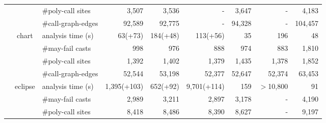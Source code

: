 \begin{table}[]
\begin{tabular}{@{}r|clrrrrrr@{}}
                                   &                           & \#poly-call sites    & 3,507                    & 3,536                      & -                           & 3,647                         & -                         & 4,183                      \\
                                   &                           & \#call-graph-edges   & 92,589                   & 92,775                     & -                           & 94,328                         & -                         & 104,457                     \\\cmidrule(){2-9}

                                   & \multirow{4}{*}{chart}    & analysis time (s)    & 63(+73)                       & 184(+48)                        & 113(+56)                        & 35                         & 196                      & 48                       \\
                                   &                           & \#may-fail casts     & 998                      & 976                        & 888                        & 974                         & 883                      & 1,810                         \\
                                   &                           & \#poly-call sites    & 1,392                    & 1,402                      & 1,379                      & 1,435                         & 1,378                         & 1,852                      \\
                                   &                           & \#call-graph-edges   & 52,544                   & 53,198                     & 52,377                     & 52,647                         & 52,374                         & 63,453                     \\\cmidrule(){2-9}
                                   & \multirow{4}{*}{eclipse}  & analysis time (s)    & 1,395(+103)                    & 652(+92)                        & 9,701(+114)                           & 159                         & $>$10,800     & 91                         \\
                                   &                           & \#may-fail casts     & 2,989                    & 3,211                      & 2,897                           & 3,178                         & -                         & 4,190                      \\
                                   &                           & \#poly-call sites    & 8,418                    & 8,486                      & 8,390                           & 8,627                         & -                         & 9,197                      \\

\end{tabular}
\end{table}
